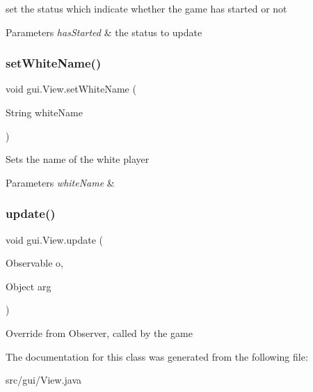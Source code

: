 set the status which indicate whether the game has started or not 
\begin{DoxyParams}{Parameters}
{\em has\+Started} & the status to update \\
\hline
\end{DoxyParams}
\mbox{\label{classgui_1_1_view_a49679332bb9ef013e497a00188bf254d}} 
\subsubsection{\texorpdfstring{set\+White\+Name()}{setWhiteName()}}
{\footnotesize\ttfamily void gui.\+View.\+set\+White\+Name (\begin{DoxyParamCaption}\item[{String}]{white\+Name }\end{DoxyParamCaption})}

Sets the name of the white player 
\begin{DoxyParams}{Parameters}
{\em white\+Name} & \\
\hline
\end{DoxyParams}
\mbox{\label{classgui_1_1_view_a0b930eff54b741b4a9c9d666180dec00}} 
\subsubsection{\texorpdfstring{update()}{update()}}
{\footnotesize\ttfamily void gui.\+View.\+update (\begin{DoxyParamCaption}\item[{Observable}]{o,  }\item[{Object}]{arg }\end{DoxyParamCaption})}

Override from Observer, called by the game 

The documentation for this class was generated from the following file\+:\begin{DoxyCompactItemize}
\item 
src/gui/View.\+java\end{DoxyCompactItemize}
